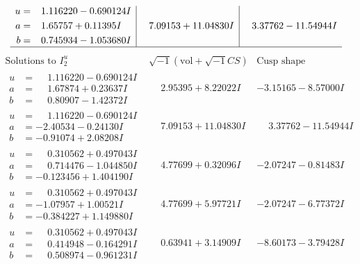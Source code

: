 \documentclass[1p]{elsarticle_modified}
\theoremstyle{definition}
\newcommand{\I}{\sqrt{-1}}
\begin{document}
$$\begin{array}{c|c|c}
\begin{aligned}
u &= \phantom{-}1.116220 - 0.690124 I \\
a &= \phantom{-}1.65757 + 0.11395 I \\
b &= \phantom{-}0.745934 - 1.053680 I\end{aligned}
 & \phantom{-}7.09153 + 11.04830 I & \phantom{-}3.37762 - 11.54944 I\\
 \hline 
 \end{array}$$\newpage$$\begin{array}{c|c|c}  
\text{Solutions to }I^u_{2}& \I (\text{vol} + \sqrt{-1}CS) & \text{Cusp shape}\\
 \hline 
\begin{aligned}
u &= \phantom{-}1.116220 - 0.690124 I \\
a &= \phantom{-}1.67874 + 0.23637 I \\
b &= \phantom{-}0.80907 - 1.42372 I\end{aligned}
 & \phantom{-}2.95395 + 8.22022 I & -3.15165 - 8.57000 I \\ \hline\begin{aligned}
u &= \phantom{-}1.116220 - 0.690124 I \\
a &= -2.40534 - 0.24130 I \\
b &= -0.91074 + 2.08208 I\end{aligned}
 & \phantom{-}7.09153 + 11.04830 I & \phantom{-}3.37762 - 11.54944 I \\ \hline\begin{aligned}
u &= \phantom{-}0.310562 + 0.497043 I \\
a &= \phantom{-}0.714476 - 1.044850 I \\
b &= -0.123456 + 1.404190 I\end{aligned}
 & \phantom{-}4.77699 + 0.32096 I & -2.07247 - 0.81483 I \\ \hline\begin{aligned}
u &= \phantom{-}0.310562 + 0.497043 I \\
a &= -1.07957 + 1.00521 I \\
b &= -0.384227 + 1.149880 I\end{aligned}
 & \phantom{-}4.77699 + 5.97721 I & -2.07247 - 6.77372 I \\ \hline\begin{aligned}
u &= \phantom{-}0.310562 + 0.497043 I \\
a &= \phantom{-}0.414948 - 0.164291 I \\
b &= \phantom{-}0.508974 - 0.961231 I\end{aligned}
 & \phantom{-}0.63941 + 3.14909 I & -8.60173 - 3.79428 I \\ \hline\begin{aligned}

\end{aligned}
\end{array}$$
\end{document}
